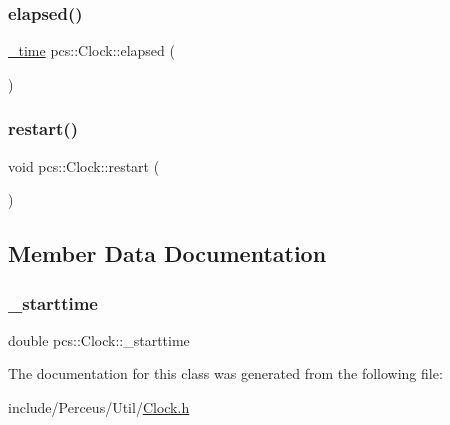 \subsubsection{\texorpdfstring{elapsed()}{elapsed()}}
{\footnotesize\ttfamily \hyperlink{structpcs_1_1Clock_1_1__time}{\+\_\+time} pcs\+::\+Clock\+::elapsed (\begin{DoxyParamCaption}{ }\end{DoxyParamCaption})\hspace{0.3cm}{\ttfamily [inline]}}

\mbox{\label{classpcs_1_1Clock_a174784ceaf9de668c92fe5a692e28af9}} 
\subsubsection{\texorpdfstring{restart()}{restart()}}
{\footnotesize\ttfamily void pcs\+::\+Clock\+::restart (\begin{DoxyParamCaption}{ }\end{DoxyParamCaption})\hspace{0.3cm}{\ttfamily [inline]}}



\subsection{Member Data Documentation}
\mbox{\label{classpcs_1_1Clock_a3307066e19f91e8af0e858f3be782094}} 
\subsubsection{\texorpdfstring{\+\_\+starttime}{\_starttime}}
{\footnotesize\ttfamily double pcs\+::\+Clock\+::\+\_\+starttime\hspace{0.3cm}{\ttfamily [private]}}



The documentation for this class was generated from the following file\+:\begin{DoxyCompactItemize}
\item 
include/\+Perceus/\+Util/\hyperlink{Clock_8h}{Clock.\+h}\end{DoxyCompactItemize}
